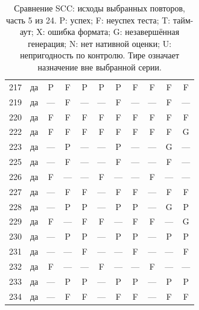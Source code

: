 \begin{table}[p]
\begin{tabular*}{\textwidth}{@{\extracolsep{\fill}}rc*{9}{c}@{}}
217 & да & P & F & P & P & P & F & F & F & F\\
219 & да & — & F & — & — & F & — & — & F & —\\
220 & да & F & F & F & F & F & F & F & F & F\\
222 & да & F & F & F & F & F & F & F & F & G\\
223 & да & — & P & — & — & P & — & — & G & —\\
225 & да & — & F & — & — & F & — & — & F & —\\
226 & да & F & — & — & F & — & — & F & — & —\\
227 & да & — & F & F & — & F & F & — & F & F\\
228 & да & — & P & P & — & P & P & — & G & P\\
229 & да & F & — & F & F & — & F & F & — & G\\
230 & да & — & P & P & — & P & P & — & P & P\\
231 & да & — & — & F & — & — & F & — & — & F\\
232 & да & F & — & — & F & — & — & F & — & —\\
233 & да & — & P & P & — & P & P & — & P & P\\
234 & да & — & F & F & — & F & F & — & F & F\\
\bottomrule\end{tabular*}
\caption{Сравнение SCC: исходы выбранных повторов, часть 5 из 24. P: успех; F: неуспех теста; T: тайм-аут; X: ошибка формата; G: незавершённая генерация; N: нет нативной оценки; U: непригодность по контролю. Тире означает назначение вне выбранной серии.}
\end{table}
\clearpage
